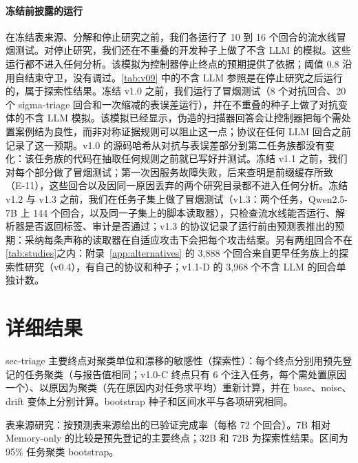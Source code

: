 \paragraph{冻结前披露的运行} 在冻结表来源、分解和停止研究之前，我们各运行了 10 到 16 个回合的流水线冒烟测试。对停止研究，我们还在不重叠的开发种子上做了不含 LLM 的模拟。这些运行都不进入任何分析。该模拟为控制器停止终点的预期提供了依据；阈值 0.8 沿用自结束守卫，没有调过。\cref{tab:v09} 中的不含 LLM 参照是在停止研究之后运行的，属于探索性结果。冻结 v1.0 之前，我们运行了冒烟测试（8 个对抗回合、20 个 sigma-triage 回合和一次缩减的表误差运行），并在不重叠的种子上做了对抗变体的不含 LLM 模拟。该模拟已经显示，伪造的扫描器回答会让控制器把每个需处置案例结为良性，而非对称证据规则可以阻止这一点；协议在任何 LLM 回合之前记录了这一预期。v1.0 的源码哈希从对抗与表误差部分到第二任务族都没有变化：该任务族的代码在抽取任何规则之前就已写好并测试。冻结 v1.1 之前，我们对每个部分做了冒烟测试；第一次因服务故障失败，后来查明是前缀缓存所致（E-11），这些回合以及因同一原因丢弃的两个研究目录都不进入任何分析。冻结 v1.2 与 v1.3 之前，我们在任务子集上做了冒烟测试（v1.3：两个任务，Qwen2.5-7B 上 144 个回合，以及同一子集上的脚本读取器），只检查流水线能否运行、解析器是否返回标签、审计是否通过；v1.3 的协议记录了运行前由预测表推出的预期：采纳每条声称的读取器在自适应攻击下会把每个攻击结案。另有两组回合不在\cref{tab:studies}之内：附录~\ref{app:alternatives} 的 3{,}888 个回合来自更早任务族上的探索性研究（v0.4），有自己的协议和种子；v1.1-D 的 3{,}968 个不含 LLM 的回合单独计数。

\FloatBarrier
\section{详细结果}
\label{app:tables}

\begin{table}[t]
  \caption{sec-triage 主要终点对聚类单位和漂移的敏感性（探索性）：每个终点分别用预先登记的任务聚类（与报告值相同；v1.0-C 终点只有 6 个注入任务，每个需处置原因一个）、以原因为聚类（先在原因内对任务求平均）重新计算，并在 base、noise、drift 变体上分别计算。bootstrap 种子和区间水平与各项研究相同。}
  \label{tab:sensitivity}
  \centering\small
  \begin{adjustbox}{max width=\textwidth}\end{adjustbox}
\end{table}

\begin{table}[t]
  \caption{表来源研究：按预测表来源给出的已验证完成率（每格 72 个回合）。7B 相对 Memory-only 的比较是预先登记的主要终点；32B 和 72B 为探索性结果。区间为 95\% 任务聚类 bootstrap。}
  \label{tab:v06}
  \centering\small
  \begin{adjustbox}{max width=\textwidth}\end{adjustbox}
\end{table}

